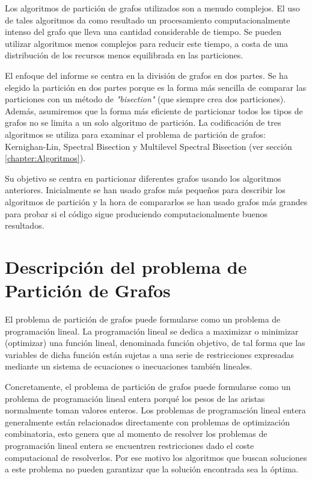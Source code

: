 Los algoritmos de partición de grafos utilizados son a menudo complejos. El uso de tales algoritmos da como resultado un procesamiento computacionalmente intenso del grafo que lleva una cantidad considerable de tiempo. Se pueden utilizar algoritmos menos complejos para reducir este tiempo, a costa de una distribución de los recursos menos equilibrada en las particiones.

El enfoque del informe se centra en la división de grafos en dos partes. Se ha elegido la partición en dos partes porque es la forma más sencilla de comparar las particiones con un método de \textit{"bisection"} (que siempre crea dos particiones). Además, asumiremos que la forma más eficiente de particionar todos los tipos de grafos no se limita a un solo algoritmo de partición. La codificación de tres algoritmos se utiliza para examinar el problema de partición de grafos: Kernighan-Lin, Spectral Bisection y Multilevel Spectral Bisection (ver sección \ref{chapter:Algoritmos}).

Su objetivo se centra en particionar diferentes grafos usando los algoritmos anteriores. Inicialmente se han usado grafos más pequeños para describir los algoritmos de partición y la hora de compararlos se han usado grafos más grandes para probar si el código sigue produciendo computacionalmente buenos resultados.

\section{Descripción del problema de Partición de Grafos}

El problema de partición de grafos puede formularse como un problema de programación lineal. La programación lineal se dedica a maximizar o minimizar (optimizar) una función lineal, denominada función objetivo, de tal forma que las variables de dicha función están sujetas a una serie de restricciones expresadas mediante un sistema de ecuaciones o inecuaciones también lineales. 

\newpage
Concretamente, el problema de partición de grafos puede formularse como un problema de programación lineal entera porqué los pesos de las aristas normalmente toman valores enteros. Los problemas de programación lineal entera generalmente están relacionados directamente con problemas de optimización combinatoria, esto genera que al momento de resolver los problemas de programación lineal entera se encuentren restricciones dado el coste computacional de resolverlos. Por ese motivo los algoritmos que buscan soluciones a este problema no pueden garantizar que la solución encontrada sea la óptima. 

